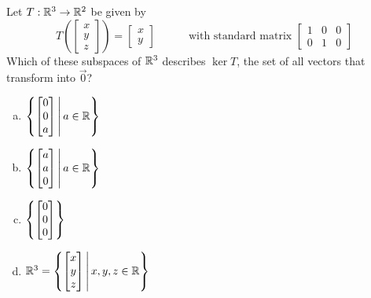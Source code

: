 \begin{activity}{5}
Let \(T: \mathbb{R}^3 \rightarrow \mathbb{R}^2\) be given by
\[
  T\left(\begin{bmatrix}x \\ y\\z \end{bmatrix} \right)
    =
  \begin{bmatrix} x \\ y \end{bmatrix}
    \hspace{3em}
    \text{with standard matrix }
  \begin{bmatrix} 1 & 0 & 0 \\ 0 & 1 & 0 \end{bmatrix}
\]
Which of these subspaces of \(\mathbb{R}^3\) describes \(\ker T\),
the set of all vectors that transform into \(\vec 0\)?
\begin{multicols}{2}
\begin{enumerate}[a)]
\item \(\left\{\begin{bmatrix}0 \\ 0\\ a\end{bmatrix}\,\middle|\,a\in\mathbb{R}\right\}\)
\item \(\left\{\begin{bmatrix}a \\ a\\ 0\end{bmatrix}\,\middle|\,a\in\mathbb{R}\right\}\)
\item \(\left\{\begin{bmatrix}0\\0\\0\end{bmatrix}\right\}\)
\item \(\mathbb{R}^3=\left\{\begin{bmatrix}x \\ y\\z\end{bmatrix}\,\middle|\,x,y,z\in\mathbb{R}\right\}\)
\end{enumerate}
\end{multicols}
\end{activity}

